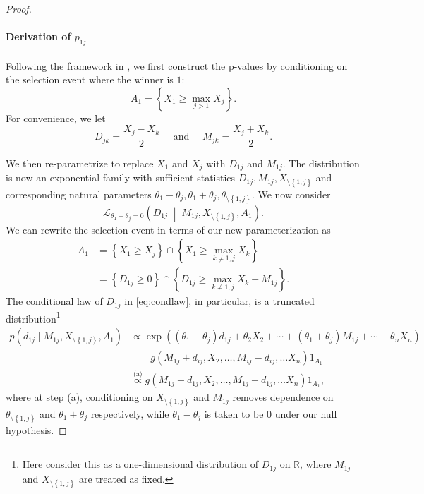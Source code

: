\documentclass[11pt]{article}
\theoremstyle{definition}
\theoremstyle{custom}
\newcommand{\RR}{\mathbb{R}}
\begin{document}
\begin{proof}
\paragraph{Derivation of $p_{1j}$}

Following the framework in \citet{Fithian:2014ws}, we first construct the p-values by conditioning on the selection event where the winner is $1$: 
$$A_1 = \left\{X_1 \ge \max_{j > 1} X_j\right\}.$$
For convenience, we let
$$D_{jk} = \frac{X_j - X_k}{2} \quad \text{ and } \quad M_{jk} = \frac{X_j + X_k}{2}.$$

We then re-parametrize to replace $X_1$ and $X_j$ with $D_{1j}$ and $M_{1j}$. The distribution is now an exponential family with sufficient statistics $D_{1j}, M_{1j}, X_{\setminus\left\{1, j\right\}}$ and corresponding natural parameters $\theta_1 - \theta_j, \theta_1 + \theta_j, \theta_{\setminus\left\{1, j\right\}}$. We now consider
\begin{equation}
\mathcal{L}_{\theta_1 - \theta_j = 0} \left(D_{1j} \;\middle|\; M_{1j}, X_{\setminus\left\{1, j\right\}}, A_1\right).
\label{eq:condlaw}
\end{equation}
We can rewrite the selection event in terms of our new parameterization as
\begin{align*}
A_1 &= \left\{X_1 \ge X_j\right\} \cap \left\{X_1 \ge \max_{k \neq 1,j} X_k\right\}\\
&= \left\{D_{1j} \ge 0\right\} \cap \left\{D_{1j} \ge \max_{k \ne 1, j} X_k - M_{1j}\right\}.
\end{align*}
The conditional law of $D_{1j}$ in \eqref{eq:condlaw}, in particular, is a truncated distribution\footnote{Here consider this as a one-dimensional distribution of $D_{1j}$ on $\RR$, where $M_{1j}$ and $X_{\setminus\left\{1, j\right\}}$ are treated as fixed.}
\begin{align*}
p\left(d_{1j} \mid M_{1j}, X_{\setminus\left\{1, j\right\}}, A_1\right) & \propto \exp\left(\left(\theta_1 - \theta_j\right) d_{1j} + \theta_2 X_2 + \cdots + \left(\theta_1 + \theta_j\right) M_{1j} + \cdots + \theta_n X_n \right) \\
& \quad\quad g\left(M_{1j} + d_{ij}, X_2, \ldots, M_{ij} - d_{ij}, \ldots X_n\right) 1_{A_1} \\
& \stackrel{\text{(a)}}{\propto} g\left(M_{1j} + d_{1j}, X_2, \ldots, M_{1j} - d_{1j}, \ldots X_n\right) 1_{A_1},
\end{align*}
where at step (a), conditioning on $X_{\setminus\left\{1, j\right\}}$ and $M_{1j}$ removes dependence on $\theta_{\setminus\left\{1, j\right\}}$ and $\theta_1 + \theta_j$ respectively, while $\theta_1 - \theta_j$ is taken to be $0$ under our null hypothesis.


\end{proof}
\end{document}
